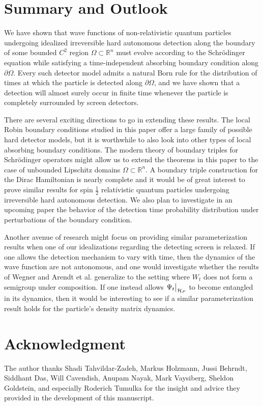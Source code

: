 \documentclass{article}
\numberwithin{equation}{section}
\begin{document}
 \section{Summary and Outlook}
 We have shown that wave functions of non-relativistic quantum particles undergoing idealized irreversible hard autonomous detection along the boundary of some bounded $C^2$ region $\Omega\subset \mathbb{R}^n$ must evolve according to the Schr\"odinger equation while satisfying a time-independent absorbing boundary condition along $\partial \Omega$. Every such detector model admits a natural Born rule for the distribution of times at which the particle is detected along $\partial \Omega$, and we have shown that a detection will almost surely occur in finite time whenever the particle is completely surrounded by screen detectors.  
 \par
 There are several exciting directions to go in extending these results. The local Robin boundary conditions studied in this paper offer a large family of possible hard detector models, but it is worthwhile to also look into other types of local absorbing boundary conditions. The modern theory of boundary triples for Schr\"odinger operators \cite{BEHRNDT2014,BEHRNDT20155903} might allow us to extend the theorems in this paper to the case of unbounded Lipschitz domains $\Omega \subset \mathbb{R}^n$. A boundary triple construction for the Dirac Hamiltonian is nearly complete \cite{SADIRAC, DiracSing} and it would be of great interest to prove similar results for spin $\frac{1}{2}$ relativistic quantum particles undergoing irreversible hard autonomous detection. We also plan to investigate in an upcoming paper \cite{DetTime} the behavior of the detection time probability distribution under perturbations of the boundary condition. 
 
 Another avenue of research might focus on providing similar parameterization results when one of our idealizations regarding the detecting screen is relaxed. If one allows the detection mechanism to vary with time, then the dynamics of the wave function are not autonomous, and one would investigate whether the results of Wegner \cite{Wegner2017} and Arendt et al. \cite{Arendt2023} generalize to the setting where $W_t$ does not form a semigroup under composition. If one instead allows $\Psi_t\big{|}_{\mathcal{H}_P}$ to become entangled in its dynamics, then it would be interesting to see if a similar parameterization result holds for the particle's density matrix dynamics. 
\section{Acknowledgment}
The author thanks Shadi Tahvildar-Zadeh, Markus Holzmann, Jussi Behrndt, Siddhant Das, Will Cavendish, Anupam Nayak, Mark Vaysiberg, Sheldon Goldstein, and especially Roderich Tumulka  for the insight and advice they provided in the development of this manuscript.
\appendix
\end{document}

